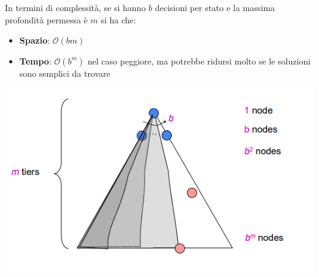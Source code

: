 \documentclass[12pt]{article}
\begin{document}
In termini di complessità, se si hanno $b$ decisioni per stato e la massima profondità permessa è $m$ si ha che:
\begin{itemize}
    \item \textbf{Spazio}: $\mathcal{O}(bm)$
    \item \textbf{Tempo}: $\mathcal{O}(b^m)$ nel caso peggiore, ma potrebbe ridursi molto se le soluzioni sono semplici da trovare
\end{itemize}
\begin{center}
    \includegraphics[width = 0.70\linewidth]{Images/30.PNG}
\end{center}
\end{document}
